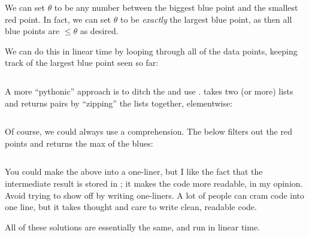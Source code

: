 \begin{soln}
    We can set $\theta$ to be any number between the biggest blue
    point and the smallest red point. In fact, we can set $\theta$
    to be \emph{exactly} the largest blue point, as then all blue
    points are $\leq \theta$ as desired.

    We can do this in linear time by looping through all of the
    data points, keeping track of the largest blue point seen
    so far:

    \inputminted{python}{\solutiondir/pp01a-enum.py}

    A more ``pythonic'' approach is to ditch the 
    and use .  takes two (or more) lists
    and returns pairs by ``zipping'' the lists together, elementwise:

    \inputminted{python}{\solutiondir/pp01a.py}

    Of course, we could always use a comprehension. The below
    filters out the red points and returns the max of the blues:

    \inputminted{python}{\solutiondir/pp01a-max.py}

    You could make the above into a one-liner, but I like the
    fact that the intermediate result is stored in ;
    it makes the code more readable, in my opinion. Avoid trying to show
    off by writing one-liners. A lot of people can cram code into
    one line, but it takes thought and care to write clean, readable code.

    All of these solutions are essentially the same, and run in
    linear time.
\end{soln}
